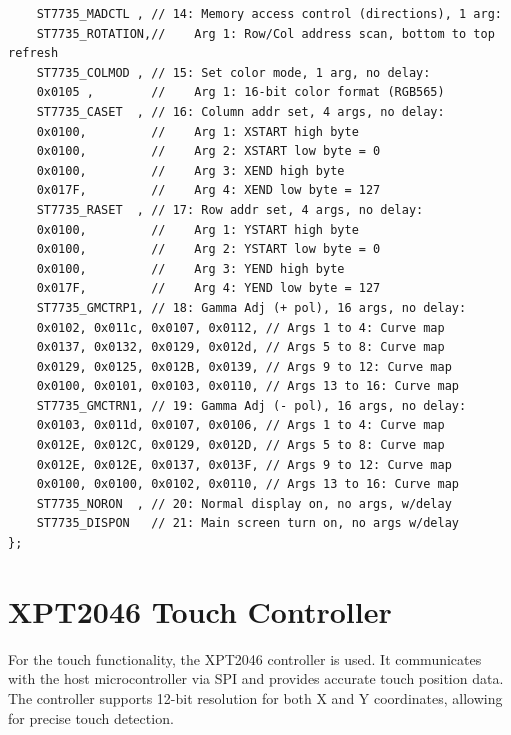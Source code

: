 \documentclass[pdflatex,sn-mathphys-num]{sn-jnl}%
\begin{document}
\begin{lstlisting}
    ST7735_MADCTL , // 14: Memory access control (directions), 1 arg:
    ST7735_ROTATION,//    Arg 1: Row/Col address scan, bottom to top refresh
    ST7735_COLMOD , // 15: Set color mode, 1 arg, no delay:
    0x0105 ,        //    Arg 1: 16-bit color format (RGB565)
    ST7735_CASET  , // 16: Column addr set, 4 args, no delay:
    0x0100,         //    Arg 1: XSTART high byte
    0x0100,         //    Arg 2: XSTART low byte = 0
    0x0100,         //    Arg 3: XEND high byte
    0x017F,         //    Arg 4: XEND low byte = 127
    ST7735_RASET  , // 17: Row addr set, 4 args, no delay:
    0x0100,         //    Arg 1: YSTART high byte
    0x0100,         //    Arg 2: YSTART low byte = 0
    0x0100,         //    Arg 3: YEND high byte
    0x017F,         //    Arg 4: YEND low byte = 127
    ST7735_GMCTRP1, // 18: Gamma Adj (+ pol), 16 args, no delay:
    0x0102, 0x011c, 0x0107, 0x0112, // Args 1 to 4: Curve map
    0x0137, 0x0132, 0x0129, 0x012d, // Args 5 to 8: Curve map
    0x0129, 0x0125, 0x012B, 0x0139, // Args 9 to 12: Curve map
    0x0100, 0x0101, 0x0103, 0x0110, // Args 13 to 16: Curve map
    ST7735_GMCTRN1, // 19: Gamma Adj (- pol), 16 args, no delay:
    0x0103, 0x011d, 0x0107, 0x0106, // Args 1 to 4: Curve map
    0x012E, 0x012C, 0x0129, 0x012D, // Args 5 to 8: Curve map
    0x012E, 0x012E, 0x0137, 0x013F, // Args 9 to 12: Curve map
    0x0100, 0x0100, 0x0102, 0x0110, // Args 13 to 16: Curve map
    ST7735_NORON  , // 20: Normal display on, no args, w/delay
    ST7735_DISPON   // 21: Main screen turn on, no args w/delay
};
\end{lstlisting}
\newpage
\section{XPT2046 Touch Controller}
For the touch functionality, the XPT2046 controller is used. It communicates with the host microcontroller via SPI and provides accurate touch position data. The controller supports 12-bit resolution for both X and Y coordinates, allowing for precise touch detection.
\end{document}
